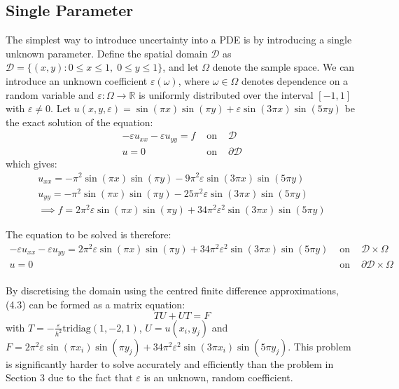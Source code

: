 \documentclass{article}
\numberwithin{equation}{section}
\begin{document}
\subsection{Single Parameter}
The simplest way to introduce uncertainty into a PDE is by introducing a single unknown parameter. Define the spatial domain $\mathcal{D}$ as $\mathcal{D} = \{(x,y) : 0 \leq x \leq 1, \; 0 \leq y \leq 1 \}$, and let $\Omega$ denote the sample space. We can introduce an unknown coefficient $\varepsilon(\omega)$, where $\omega \in \Omega$ denotes dependence on a random variable and $\varepsilon: \Omega \rightarrow \mathbb{R}$ is uniformly distributed over the interval $[-1,1]$ with $\varepsilon \neq 0$. Let $u(x,y,\varepsilon) = \sin(\pi x)\sin(\pi y) + \varepsilon \sin(3 \pi x) \sin(5 \pi y)$ be the exact solution of the equation:
\begin{eqnarray}
-\varepsilon u_{xx} -\varepsilon u_{yy} = f & \text{ on } & \mathcal{D} \nonumber \\
u = 0 & \text{ on } & \partial \mathcal{D}
\end{eqnarray}
which gives:
\begin{eqnarray}
u_{xx} = -\pi^2 \sin(\pi x) \sin(\pi y) - 9\pi^2 \varepsilon \sin(3\pi x) \sin(5\pi y) \nonumber \\
u_{yy} = -\pi^2 \sin(\pi x) \sin(\pi y) - 25\pi^2 \varepsilon \sin(3\pi x) \sin(5\pi y) \nonumber \\
\implies f = 2\pi^2 \varepsilon \sin(\pi x) \sin(\pi y) + 34\pi^2 \varepsilon^2 \sin(3\pi x) \sin(5\pi y)
\end{eqnarray}

The equation to be solved is therefore:
\begin{eqnarray}
- \varepsilon u_{xx} - \varepsilon u_{yy} = 2\pi^2 \varepsilon \sin(\pi x) \sin(\pi y)+ 34 \pi^2 \varepsilon^2 \sin(3 \pi x) \sin(5 \pi y) & \text{ on } & \mathcal{D} \times \Omega \nonumber \\
u = 0 & \text{ on } & \partial \mathcal{D} \times \Omega \nonumber \\
\end{eqnarray}

By discretising the domain using the centred finite difference approximations, (4.3) can be formed as a matrix equation:
\begin{equation}
TU + UT = F
\end{equation}
with $T = -\frac{\varepsilon}{h^2} \text{tridiag}(1,-2,1)$, $U = u(x_i, y_j)$ and $F = 2\pi^2 \varepsilon \sin(\pi x_i) \sin(\pi y_j)+ 34 \pi^2 \varepsilon^2 \sin(3 \pi x_i) \sin(5 \pi y_j)$. This problem is significantly harder to solve accurately and efficiently than the problem in Section 3 due to the fact that $\varepsilon$ is an unknown, random coefficient.
\end{document}
